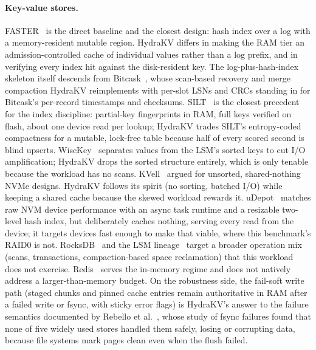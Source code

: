 \documentclass{article}
\begin{document}
\paragraph{Key-value stores.} FASTER~\cite{faster} is the direct baseline and the closest design: hash index over a log with a memory-resident mutable region. HydraKV differs in making the RAM tier an admission-controlled cache of individual values rather than a log prefix, and in verifying every index hit against the disk-resident key. The log-plus-hash-index skeleton itself descends from Bitcask~\cite{bitcask}, whose scan-based recovery and merge compaction HydraKV reimplements with per-slot LSNs and CRCs standing in for Bitcask's per-record timestamps and checksums. SILT~\cite{silt} is the closest precedent for the index discipline: partial-key fingerprints in RAM, full keys verified on flash, about one device read per lookup; HydraKV trades SILT's entropy-coded compactness for a mutable, lock-free table because half of every scored second is blind upserts. WiscKey~\cite{wisckey} separates values from the LSM's sorted keys to cut I/O amplification; HydraKV drops the sorted structure entirely, which is only tenable because the workload has no scans. KVell~\cite{kvell} argued for unsorted, shared-nothing NVMe designs. HydraKV follows its spirit (no sorting, batched I/O) while keeping a shared cache because the skewed workload rewards it. uDepot~\cite{udepot} matches raw NVM device performance with an async task runtime and a resizable two-level hash index, but deliberately caches nothing, serving every read from the device; it targets devices fast enough to make that viable, where this benchmark's RAID0 is not. RocksDB~\cite{rocksdb} and the LSM lineage~\cite{lsm} target a broader operation mix (scans, transactions, compaction-based space reclamation) that this workload does not exercise. Redis~\cite{redis} serves the in-memory regime and does not natively address a larger-than-memory budget. On the robustness side, the fail-soft write path (staged chunks and pinned cache entries remain authoritative in RAM after a failed write or fsync, with sticky error flags) is HydraKV's answer to the failure semantics documented by Rebello et al.~\cite{fsyncfail}, whose study of fsync failures found that none of five widely used stores handled them safely, losing or corrupting data, because file systems mark pages clean even when the flush failed.
\end{document}
